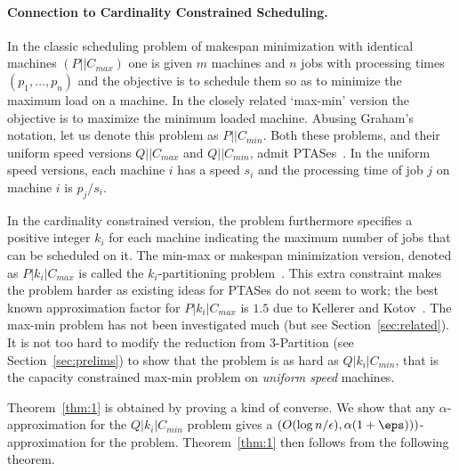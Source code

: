 \paragraph{Connection to Cardinality Constrained Scheduling.}
In the classic scheduling problem of makespan minimization with identical machines $(P||C_{max})$ one is given $m$ machines and $n$ jobs with processing times $(p_1,\ldots,p_n)$	and the objective is to schedule them so as to minimize the maximum load on a machine.
In the closely related `max-min' version the objective is to maximize the minimum loaded machine. Abusing Graham's notation, let us denote this problem as $P||C_{min}$.
Both these problems, and their uniform speed versions $Q||C_{max}$ and $Q||C_{min}$, admit PTASes~\cite{bibid}. In the uniform speed versions, each machine $i$  has a speed $s_i$ and the processing time of job $j$ on machine $i$ is $p_j/s_i$.

In the cardinality constrained version, the problem furthermore specifies a positive integer $k_i$ for each machine indicating the maximum number of jobs that can be scheduled on it. The min-max or makespan minimization version, denoted as $P|k_i|C_{max}$ is called the $k_i$-partitioning problem~\cite{bibid}.  This extra constraint makes the problem harder as existing ideas for PTASes do not seem to work; the best known approximation factor for $P|k_i|C_{max}$ is $1.5$ due to Kellerer and Kotov~\cite{KK11}.
The max-min problem has not been investigated much (but see Section~\ref{sec:related}).
It is not too hard to modify the reduction from $3$-Partition (see Section~\ref{sec:prelims}) to show that the \mckc problem is as hard as $Q|k_i|C_{min}$, that is the capacity constrained max-min problem on {\em uniform speed} machines.

Theorem~\ref{thm:1} is obtained by proving a kind of converse. We show that any $\alpha$-approximation for the $Q|k_i|C_{min}$ problem gives a $\left(O(\log n/\epsilon), \alpha(1+\eps))\right)$-approximation for the \mckc problem.
Theorem~\ref{thm:1} then follows from the following theorem.\fi
%



